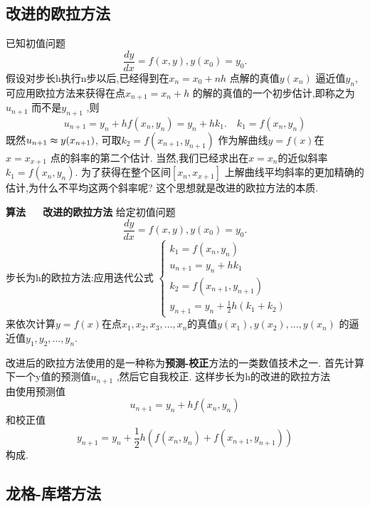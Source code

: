 \documentclass[openany]{book}
\begin{document}
\subsection{改进的欧拉方法}
已知初值问题
\begin{equation}
  \frac{dy}{dx}=f(x,y),y(x_0)=y_0.
\end{equation}
假设对步长h执行n步以后,已经得到在$x_n=x_0+nh$ 点解的真值$y(x_n)$ 逼近值$y_n$, 可应用欧拉方法来获得在点$x_{n+1}=x_n+h$ 的解的真值的一个初步估计,即称之为$u_{n+1}$ 而不是$y_{n+1}$ ,则
\begin{equation}
  u_{n+1}=y_n+hf(x_n,y_n)=y_n+hk_1. \quad k_1=f(x_n,y_n)
\end{equation}
既然$u_{n+1}\thickapprox y(x_{n+1})$, 可取$k_2=f(x_{n+1},y_{n+1})$ 作为解曲线$y=f(x)$在$x=x_{x+1}$ 点的斜率的第二个估计. \newline
当然,我们已经求出在$x=x_n$的近似斜率$k_1=f(x_n,y_n)$. 为了获得在整个区间$[x_n,x_{x+1}]$ 上解曲线平均斜率的更加精确的估计,为什么不平均这两个斜率呢? \newline 这个思想就是改进的欧拉方法的本质.
\begin{theorem}
  {\bf 算法~~~改进的欧拉方法} \newline
给定初值问题
\begin{equation}
  \frac{dy}{dx}=f(x,y),y(x_0)=y_0.
\end{equation}
步长为h的欧拉方法:应用迭代公式
$
\begin{cases}
  k_1=f(x_n,y_n) \\
  u_{n+1}=y_n+hk_1 \\
  k_2=f(x_{n+1},y_{n+1}) \\
  y_{n+1}=y_n+\frac{1}{2}h(k_1+k_2)
\end{cases}
$
\\
来依次计算$y=f(x)$在点$x_1,x_2,x_3,\ldots,x_n$的真值$y(x_1),y(x_2),\ldots,y(x_n)$ 的逼近值$y_1,y_2,\ldots,y_n$. 
\end{theorem}
\begin{note}
  改进后的欧拉方法使用的是一种称为{\bf 预测-校正}方法的一类数值技术之一. 首先计算下一个y值的预测值$u_{n+1}$ ,然后它自我校正. 这样步长为h的改进的欧拉方法\\
  由使用预测值
  \begin{equation}
    u_{n+1}=y_n+hf(x_n,y_n)
  \end{equation}
  和校正值
  \begin{equation}
    y_{n+1}=y_n+\frac{1}{2}h(f(x_n,y_n)+f(x_{n+1},y_{n+1}))
  \end{equation}
  构成.
\end{note}

\subsection{龙格-库塔方法}
\end{document}
